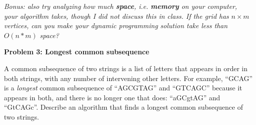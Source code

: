 \documentclass[]{article}
\begin{document}
\textit{Bonus: also try analyzing how much \textbf{space}, i.e. \textbf{memory} on your computer, your algorithm takes,
though I did not discuss this in class. If the grid has $n \times m$ vertices,
can you make your dynamic programming solution take less than $O(n*m)$ space?}

\medskip
\textbf{Problem 3: Longest common subsequence}

A common subsequence of two strings is a list of letters that
appears in order in both strings, with any number of intervening other letters. For
example, ``GCAG'' is a \textit{longest} common subsequence of ``AGCGTAG'' and ``GTCAGC''
because it appears in both, and there is no longer one that does: ``aGCgtAG'' and ``GtCAGc''.
Describe an algorithm that finds a longest common subsequence of two strings.
\end{document}
